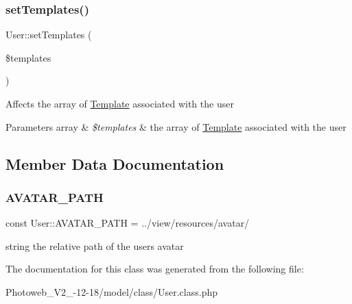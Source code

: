 \subsubsection{\texorpdfstring{set\+Templates()}{setTemplates()}}
{\footnotesize\ttfamily User\+::set\+Templates (\begin{DoxyParamCaption}\item[{}]{\$templates }\end{DoxyParamCaption})}

Affects the array of \hyperlink{classTemplate}{Template} associated with the user 
\begin{DoxyParams}[1]{Parameters}
array & {\em \$templates} & the array of \hyperlink{classTemplate}{Template} associated with the user \\
\hline
\end{DoxyParams}


\subsection{Member Data Documentation}
\mbox{\label{classUser_a3d0169a66a924f3be81934070fe9cc5d}} 
\subsubsection{\texorpdfstring{A\+V\+A\+T\+A\+R\+\_\+\+P\+A\+TH}{AVATAR\_PATH}}
{\footnotesize\ttfamily const User\+::\+A\+V\+A\+T\+A\+R\+\_\+\+P\+A\+TH = \textquotesingle{}../view/resources/avatar/\textquotesingle{}}

string the relative path of the user\textquotesingle{}s avatar 

The documentation for this class was generated from the following file\+:\begin{DoxyCompactItemize}
\item 
Photoweb\+\_\+\+V2\+\_-\/12-\/18/model/class/User.\+class.\+php\end{DoxyCompactItemize}
